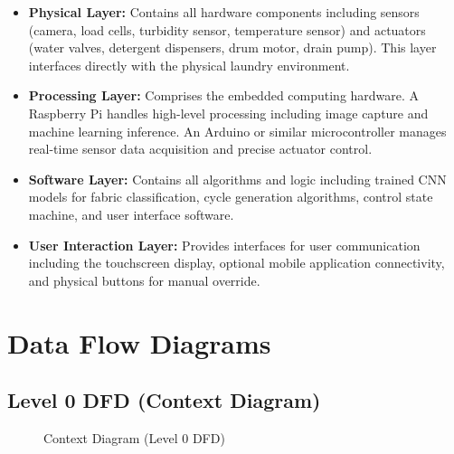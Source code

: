 \begin{itemize}
    \item \textbf{Physical Layer:} Contains all hardware components including sensors (camera, load cells, turbidity sensor, temperature sensor) and actuators (water valves, detergent dispensers, drum motor, drain pump). This layer interfaces directly with the physical laundry environment.
    \item \textbf{Processing Layer:} Comprises the embedded computing hardware. A Raspberry Pi handles high-level processing including image capture and machine learning inference. An Arduino or similar microcontroller manages real-time sensor data acquisition and precise actuator control.
    \item \textbf{Software Layer:} Contains all algorithms and logic including trained CNN models for fabric classification, cycle generation algorithms, control state machine, and user interface software.
    \item \textbf{User Interaction Layer:} Provides interfaces for user communication including the touchscreen display, optional mobile application connectivity, and physical buttons for manual override.
\end{itemize}

\section{Data Flow Diagrams}

\subsection{Level 0 DFD (Context Diagram)}

\begin{figure}[H]
\centering
{}
\caption{Context Diagram (Level 0 DFD)}
\label{fig:dfd0}
\end{figure}

